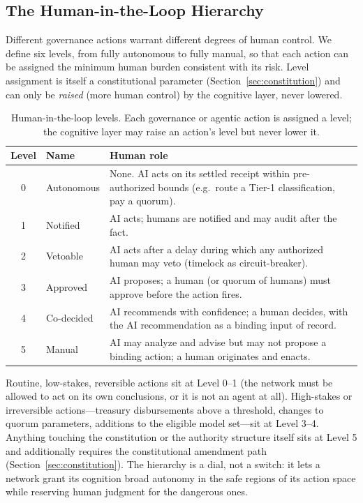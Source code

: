 \subsection{The Human-in-the-Loop Hierarchy}

Different governance actions warrant different degrees of human control. We define six levels, from fully autonomous to fully manual, so that each action can be assigned the minimum human burden consistent with its risk. Level assignment is itself a constitutional parameter (Section~\ref{sec:constitution}) and can only be \emph{raised} (more human control) by the cognitive layer, never lowered.

\begin{table}[h]
\centering
\caption{Human-in-the-loop levels. Each governance or agentic action is assigned a level; the cognitive layer may raise an action's level but never lower it.}
\label{tab:hitl}
\small
\begin{tabular}{@{}clp{8.2cm}@{}}
\toprule
Level & Name & Human role \\
\midrule
0 & Autonomous & None. AI acts on its settled receipt within pre-authorized bounds (e.g.\ route a Tier-1 classification, pay a quorum). \\
1 & Notified & AI acts; humans are notified and may audit after the fact. \\
2 & Vetoable & AI acts after a delay during which any authorized human may veto (timelock as circuit-breaker). \\
3 & Approved & AI proposes; a human (or quorum of humans) must approve before the action fires. \\
4 & Co-decided & AI recommends with confidence; a human decides, with the AI recommendation as a binding input of record. \\
5 & Manual & AI may analyze and advise but may not propose a binding action; a human originates and enacts. \\
\bottomrule
\end{tabular}
\end{table}

Routine, low-stakes, reversible actions sit at Level 0--1 (the network must be allowed to act on its own conclusions, or it is not an agent at all). High-stakes or irreversible actions---treasury disbursements above a threshold, changes to quorum parameters, additions to the eligible model set---sit at Level 3--4. Anything touching the constitution or the authority structure itself sits at Level 5 and additionally requires the constitutional amendment path (Section~\ref{sec:constitution}). The hierarchy is a dial, not a switch: it lets a network grant its cognition broad autonomy in the safe regions of its action space while reserving human judgment for the dangerous ones.

